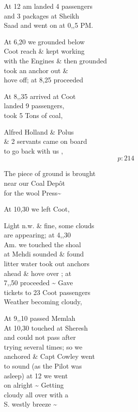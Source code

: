 \documentclass{report}
\begin{document}
	\par{
 	At 12 am landed 4 passengers\ \\and 3 packages at Sheikh\ \\Saad and went on at 0,,5 PM.\ \\
	}

	\par{
 	At 6,20 we grounded below\ \\Coot reach \& kept working\ \\with the Engines \& then grounded\ \\took an anchor out \&\ \\hove off; at 8,25 proceeded\ \\
	}

	\par{
 	At 8,,35 arrived at Coot\ \\landed 9 passengers,\ \\took 5 Tons of coal,\ \\
	}

	\par{
 	Alfred Holland \& Polus\ \\\& 2 servants came on board\ \\to go back with us ,\ \\
  \[p: 214 \]

	}

	\par{
 	The piece of ground is brought\ \\near our Coal Depôt\ \\for the wool Press\~{}\ \\
	}

	\par{
 	At 10,30 we left Coot,\ \\
	}

	\par{
 	Light n.w. \& fine, some clouds\ \\are appearing; at 4,,30\ \\Am. we touched the shoal\ \\at Mehdi sounded \& found\ \\litter water took out anchors\ \\ahead \& hove over ; at\ \\7,,50 proceeded \~{} Gave\ \\tickets to 23 Coot passengers\ \\Weather becoming cloudy,\ \\
	}

	\par{
 	At 9,,10 passed Memlah\ \\At 10,30 touched at Sheresh\ \\and could not pass after\ \\trying several times; so we\ \\anchored \& Capt Cowley went\ \\to sound (as the Pilot was\ \\asleep) at 12 we went\ \\on alright \~{} Getting\ \\cloudy all over with a\ \\S. westly breeze \~{}\ \\
	}
\end{document}
